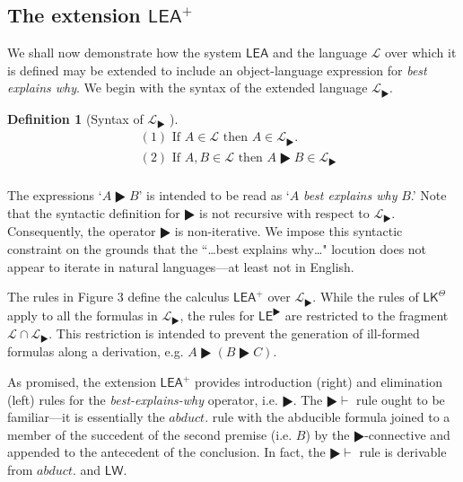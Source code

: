 \documentclass{article}
\theoremstyle{definition}
\theoremstyle{definition}
\theoremstyle{definition}
\theoremstyle{definition}
\newtheorem{definition}{Definition}
\theoremstyle{remark}
\theoremstyle{definition}
\theoremstyle{definition}
\begin{document}
\subsection{The extension $ \mathsf{LEA^+}$}


We shall now demonstrate how the system $ \mathsf{LEA}$ and the language $ \mathcal{L} $ over which it is defined may be extended to include an object-language expression for \textit{best explains why}. We begin with the syntax of the extended language $ \mathcal{L}_\RHD $.

\begin{definition}[Syntax of $ \mathcal{L}_\RHD $ ]
\begin{equation}\nonumber
\begin{split}
	& (1)\,\, \text{If}\,\,  A \in \mathcal{L}  \,\,\text{then}\,\,  A \in \mathcal{L}_\RHD .\\
 & (2) \,\,\text{If}\,\,  A, B \in \mathcal{L} \,\,\text{then}\,\, A \RHD B \in \mathcal{L}_\RHD\\
\end{split}
\end{equation}
\end{definition}

The expressions `$A \RHD B$' is intended to be read as `$ A $ \textit{best explains why} $ B$.' Note that the syntactic definition for $ \RHD $ is not recursive with respect to $ \mathcal{L}_\RHD $. Consequently, the operator $ \RHD $ is non-iterative.  We impose this syntactic constraint on the grounds that the ``\dots best explains why\ldots" locution does not appear to iterate in natural languages---at least not in English. 

The rules in Figure 3 define the calculus $ \mathsf{LEA^+}$ over $ \mathcal{L}_\RHD $. While the rules of $ \mathsf{LK}^\Theta $ apply to all the formulas in $ \mathcal{L}_\RHD $, the rules for $ \mathsf{LE}^\RHD $ are restricted to the fragment $ \mathcal{L}\cap\mathcal{L}_\RHD $. This restriction is intended to prevent the generation of ill-formed formulas along a derivation, e.g. $ A \RHD (B \RHD C) $. 

As promised, the extension $ \mathsf{LEA^+}$ provides introduction (right) and elimination (left) rules for the \textit{best-explains-why} operator, i.e. $\RHD $. The $ \RHD\vdash $ rule ought to be familiar---it is essentially the $ abduct. $ rule with the abducible formula joined to a member of the succedent of the second premise (i.e. $ B $) by the $ \RHD $-connective and appended to the antecedent of the conclusion. In fact, the $ \RHD\vdash $ rule is derivable from $ abduct. $ and $ \mathsf{LW} $. %
\end{document}
